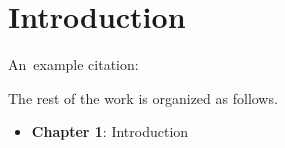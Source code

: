 \chapter*{Introduction}

An~example citation: \cite{Andel07}

The rest of the work is organized as follows.

\begin{itemize}
    \item \textbf{Chapter 1}: Introduction
\end{itemize}

